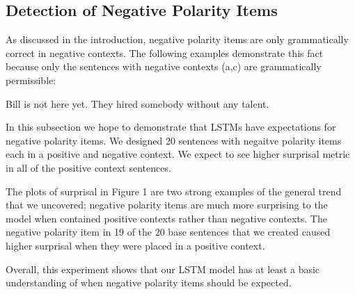 \documentclass[11pt]{article}
\begin{document}
\subsection{Detection of Negative Polarity Items}
As discussed in the introduction, negative polarity items are only grammatically correct in negative contexts. The following examples demonstrate this fact because only the sentences with negative contexts (a,c) are grammatically permissible:
\begin{exe}
\ex
\begin{xlist}
\ex Bill is not here yet.
\ex They hired somebody without any talent.
\end{xlist}
\end{exe}
In this subsection we hope to demonstrate that LSTMs have expectations for negative polarity items. We designed 20 sentences with negaitve polarity items each in a positive and negative context. We expect to see higher surprisal metric in all of the positive context sentences.

The plots of surprisal in Figure 1 are two strong examples of the general trend that we uncovered; negative polarity items are much more surprising to the model when contained positive contexts rather than negative contexts. The negative polarity item in 19 of the 20 base sentences that we created caused higher surprisal when they were placed in a positive context. 

Overall, this experiment shows that our LSTM model has at least a basic understanding of when negative polarity items should be expected.
\end{document}
